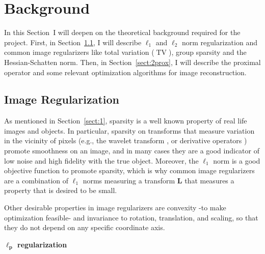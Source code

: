\section{Background} \label{sect:2}

In this Section~I will deepen on the theoretical background required for the project. First, in Section~\ref{sect:2regularizers}, I will describe $\ell_1$ and $\ell_2$ norm regularization and common image regularizers like total variation ($\operatorname{TV}$), group sparsity and the Hessian-Schatten norm. Then, in Section~\ref{sect:2prox}, I will describe the proximal operator and some relevant optimization algorithms for image reconstruction. 

\subsection{Image Regularization}  \label{sect:2regularizers}

As mentioned in Section~\ref{sect:1}, sparsity is a well known property of real life images and objects. In particular, sparsity on transforms that measure variation in the vicinity of pixels (e.g., the wavelet transform \cite{vonesch_fast_2009}, or derivative operators \cite{soubies_pocket_2019, chambolle_image_1997}) promote smoothness on an image, and in many cases they are a good indicator of low noise and high fidelity with the true object. Moreover, the $\ell_1$ norm is a good objective function to promote sparsity, which is why common image regularizers are a combination of $\ell_1$ norms measuring a transform $\mathbf{L}$ that measures a property that is desired to be small.

Other desirable properties in image regularizers are convexity -to make optimization feasible- and  invariance to rotation, translation, and scaling, so that they do not depend on any specific coordinate axis. 

\noindent\textbf{$\mathbf{\ell_p}$ regularization} 

